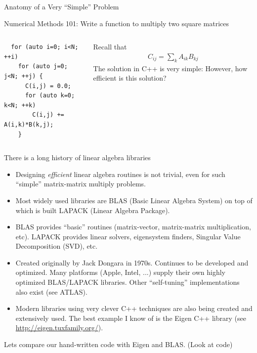 \documentclass[aspectratio=169]{beamer}
\newcommand{\mypause}{}
\newcommand{\myb}[1]{{\color{blue} {#1}}}
\begin{document}
\begin{frame}[fragile]{Anatomy of a Very ``Simple'' Problem}

  \myb{Numerical Methods 101: Write a function to multiply two square
    matrices}%
  \vskip0.1in%
  \begin{columns}
    \begin{column}{0.4\linewidth}
\begin{verbatim}
  for (auto i=0; i<N; ++i)
    for (auto j=0; j<N; ++j) {
      C(i,j) = 0.0;
      for (auto k=0; k<N; ++k)
        C(i,j) += A(i,k)*B(k,j);
    }
\end{verbatim}
  \end{column}
  
  \begin{column}{0.5\linewidth}
    Recall that
    \begin{align*}
      C_{ij} = \sum_k A_{ik} B_{kj}
    \end{align*}
    \mypause%
    \vskip0.1in%
    The solution in C++ is very simple: However, how efficient is this
    solution?
  \end{column}
\end{columns}  

\end{frame}

\begin{frame}{There is a long history of linear algebra libraries}
  \footnotesize%
  \begin{itemize}
  \item Designing \emph{efficient} linear algebra routines is not
    trivial, even for such ``simple'' matrix-matrix multiply problems.
  \item Most widely used libraries are BLAS (Basic Linear Algebra
    System) on top of which is built LAPACK (Linear Algebra Package).
  \item BLAS provides ``basic'' routines (matrix-vector, matrix-matrix
    multiplication, etc). LAPACK provides linear solvers, eigensystem
    finders, Singular Value Decomposition (SVD), etc.
  \item Created originally by Jack Dongara in 1970s. Continues to be
    developed and optimized. Many platforms (Apple, Intel, ...) supply
    their own highly optimized BLAS/LAPACK libraries. Other
    ``self-tuning'' implementations also exist (see ATLAS).
  \item Modern libraries using very clever C++ techniques are also
    being created and extensively used. The best example I know of is
    the Eigen C++ library (see \url{http://eigen.tuxfamily.org/}).
  \end{itemize}
  \normalsize%
  \myb{Lets compare our hand-written code with Eigen and BLAS. (Look
    at code)}

\end{frame}
\end{document}
